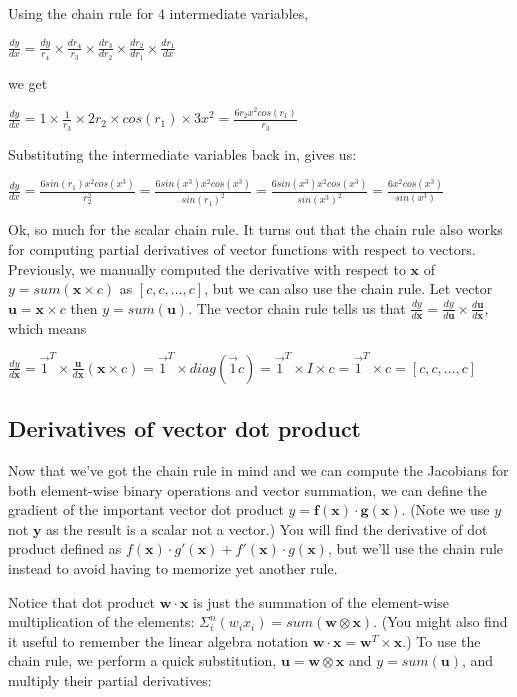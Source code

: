 \documentclass[11pt]{article}
\begin{document}
Using the chain rule for 4 intermediate variables,

$\frac{dy}{dx} = \frac{dy}{r_4} \times \frac{d r_4}{r_3} \times \frac{dr_3}{d r_2} \times \frac{dr_2}{dr_1} \times \frac{dr_1}{dx}$

we get

$\frac{dy}{dx} = 1 \times \frac{1}{r_3} \times 2r_2 \times cos(r_1) \times 3x^2 = \frac{6r_2x^2cos(r_1)}{r_3}$

Substituting the intermediate variables back in, gives us:

$\frac{dy}{dx} = \frac{6sin(r_1)x^2cos(x^3)}{r_2^2} = \frac{6sin(x^3)x^2cos(x^3)}{sin(r_1)^2} = \frac{6sin(x^3)x^2cos(x^3)}{sin(x^3)^2} = \frac{6x^2cos(x^3)}{sin(x^3)}$

Ok, so much for the scalar chain rule. It turns out that the chain rule also works for computing partial derivatives of vector functions with respect to vectors.  Previously, we manually computed the derivative with respect to $\mathbf{x}$ of $y = sum(\mathbf{x} \times c)$ as $[c, c, \ldots, c]$, but we can also use the chain rule. Let vector $\mathbf{u} = \mathbf{x} \times c$ then $y = sum(\mathbf{u})$. The vector chain rule tells us that $\frac{dy}{d\mathbf{x}} = \frac{dy}{d\mathbf{u}} \times \frac{d\mathbf{u}}{d\mathbf{x}}$, which means 

$\frac{dy}{d\mathbf{x}} = \vec{1}^T \times \frac{\mathbf{u}}{d\mathbf{x}} (\mathbf{x} \times c) = \vec{1}^T \times diag(\vec{1}c) = \vec{1}^T \times I \times c = \vec{1}^T \times c = [c, c, \ldots, c]$

\subsection{Derivatives of vector dot product}

Now that we've got the chain rule in mind and we can compute the Jacobians for both element-wise binary operations and vector summation, we can define the gradient of the important vector dot product $y = \mathbf{f(x)} \cdot \mathbf{g(x)}$. (Note we use $y$ not $\mathbf{y}$ as the result is a scalar not a vector.) You will find the derivative of dot product defined as $f(\mathbf{x}) \cdot g'(\mathbf{x}) + f'(\mathbf{x}) \cdot g(\mathbf{x})$, but we'll use the chain rule instead to avoid having to memorize yet another rule.

Notice that dot product $\mathbf{w} \cdot \mathbf{x}$ is just the summation of the element-wise multiplication of the elements: $\Sigma_i^n (w_i x_i) = sum(\mathbf{w} \otimes \mathbf{x})$. (You might also find it useful to remember the linear algebra notation $\mathbf{w} \cdot \mathbf{x} = \mathbf{w}^{T} \times \mathbf{x}$.)  To use the chain rule, we perform a quick substitution, $\mathbf{u} = \mathbf{w} \otimes \mathbf{x}$ and $y = sum(\mathbf{u})$, and multiply their partial derivatives:
\end{document}
